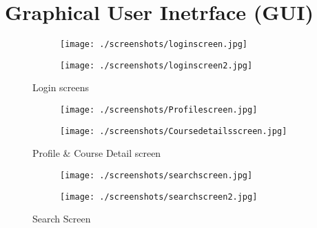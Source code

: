 \section{Graphical User Inetrface (GUI)}

\begin{figure}[!h]
    \centering
    \begin{subfigure}{.5\textwidth}
      \centering
      \texttt{[image: ./screenshots/loginscreen.jpg]}
      \label{fig:loginscreen}
    \end{subfigure}%
    \begin{subfigure}{.5\textwidth}
      \centering
      \texttt{[image: ./screenshots/loginscreen2.jpg]}
      \label{fig:loginscrren2}
    \end{subfigure}
    \caption{Login screens}
    \label{fig:loginscreens}
    \end{figure}

    \begin{figure}
        \centering
        \begin{subfigure}{.5\textwidth}
          \centering
          \texttt{[image: ./screenshots/Profilescreen.jpg]}
          \label{fig:profilescreen}
        \end{subfigure}%
        \begin{subfigure}{.5\textwidth}
          \centering
          \texttt{[image: ./screenshots/Coursedetailsscreen.jpg]}
          \label{fig:corursedeatilscreen}
        \end{subfigure}
        \caption{Profile \& Course Detail screen}
        \label{fig: profileandcourse}
        \end{figure}

    \begin{figure}
        \centering
        \begin{subfigure}{.5\textwidth}
          \centering
          \texttt{[image: ./screenshots/searchscreen.jpg]}
          \label{fig:searchscreen}
        \end{subfigure}%
        \begin{subfigure}{.5\textwidth}
          \centering
          \texttt{[image: ./screenshots/searchscreen2.jpg]}
          \label{fig:searchscreen2}
        \end{subfigure}
        \caption{Search Screen}
        \label{fig:searchscreens}
        \end{figure}

